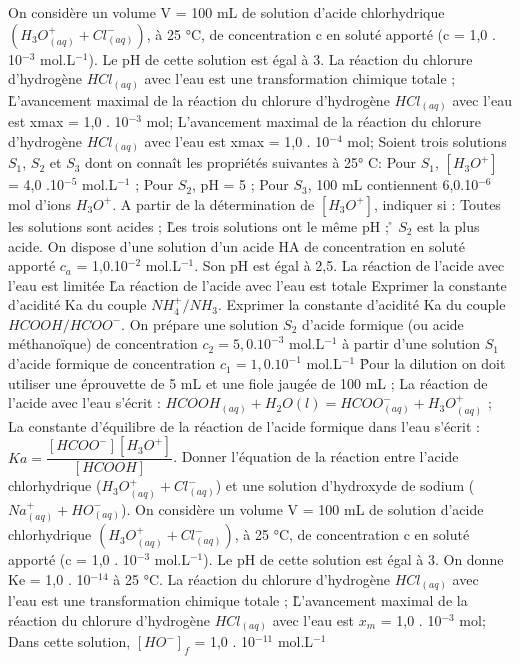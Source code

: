 \q	
   On considère un volume V = 100 mL de solution d'acide chlorhydrique $(H_3O^+_{(aq)} + Cl^-_{(aq)})$, à 25 °C, de concentration c en soluté apporté (c = 1,0 . 10$^{-3}$ mol.L$^{-1}$). Le pH de cette solution est égal à 3. 
\rv
  La réaction du chlorure d'hydrogène $HCl_{(aq)}$ avec l'eau est une transformation chimique totale ;
\r
  L'avancement maximal de la réaction du chlorure d'hydrogène $HCl_{(aq)}$ avec l'eau est xmax = 1,0 . 10$^{-3}$ mol;
  \rv
  L'avancement maximal de la réaction du chlorure d'hydrogène $HCl_{(aq)}$ avec l'eau est xmax = 1,0 . 10$^{-4}$ mol;
 \q	
Soient trois solutions $S_1$, $S_2$ et $S_3$ dont on connaît les propriétés suivantes à 25° C:
Pour $S_1$, $[H_3O^+]$ = 4,0 .10$^{-5}$ mol.L$^{-1}$ ;
Pour $S_2$, pH = 5 ;
Pour $S_3$, 100 mL contiennent 6,0.10$^{-6}$ mol d'ions $H_3O^+$.
A partir de la détermination de $[H_3O^+]$, indiquer si :
\rv
Toutes les solutions sont acides ;
\r
Les trois solutions ont le même pH ;
\r
$S_2$ est la plus acide.
\q	
On dispose d'une solution d'un acide HA de concentration en soluté apporté $c_a$ = 1,0.10$^{-2}$  mol.L$^{-1}$. Son pH est égal à  2,5.
\rv
La réaction de l'acide avec l'eau est limitée 
\r
La réaction de l'acide avec l'eau est totale
\q	
Exprimer la constante d'acidité Ka du couple $NH_4^+/ NH_3$.
\q	Exprimer la constante d'acidité Ka du couple $HCOOH/HCOO^{-}$.
   \q	
On prépare une solution $S_2$ d'acide formique (ou acide méthanoïque) de concentration        $c_2 = 5,0 . 10^{-3}$ mol.L$^{-1}$ à partir d'une solution $S_1$ d'acide formique de concentration $c_1 =1,0 . 10^{-1}$ mol.L$^{-1}$ 
\r
Pour la dilution on doit utiliser une éprouvette de 5 mL et une fiole jaugée de 100 mL ;
\rv 
La réaction de l'acide avec l'eau s'écrit :
$HCOOH_{(aq)}+H_2O(l) = HCOO^{-} _{(aq)}+ H_3O^+ _{(aq)}$ ;
\rv
La constante d'équilibre de la réaction de l'acide formique dans l'eau s'écrit :
$Ka=\dfrac{[HCOO^{-}][H_3O^+]}{[HCOOH]}$.
\q	
Donner l'équation de la réaction entre l'acide chlorhydrique ($H_3O^+_{(aq)} + Cl^{-}_{(aq)}$) et une solution d'hydroxyde de sodium ($Na^{+}_{(aq)} + HO^{-}_{(aq)}$).
  \q	
On considère un volume V = 100 mL de solution d'acide chlorhydrique $(H_3O^+_{(aq)} + Cl^-_{(aq)})$, à 25 °C, de concentration c en soluté apporté (c = 1,0 . 10$^{-3}$ mol.L$^{-1}$). Le pH de cette solution est égal à 3. 
On donne Ke = 1,0 . 10$^{-14}$ à 25 °C.
\rv
La réaction du chlorure d'hydrogène $HCl_{(aq)}$ avec l'eau est une transformation chimique totale ;
\r
L'avancement maximal de la réaction du chlorure d'hydrogène $HCl_{(aq)}$ avec l'eau est $x_m$ = 1,0 . 10$^{-3}$ mol;
\rv
Dans cette solution, $[HO^{-}]_f$ = 1,0 . 10$^{-11}$ mol.L$^{-1}$   
